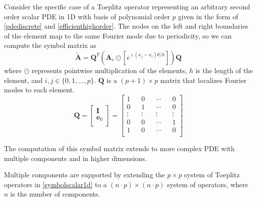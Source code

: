 \documentclass[review]{siamart190516}
\begin{document}
Consider the specific case of a Toeplitz operator representing an arbitrary second order scalar PDE in 1D with basis of polynomial order $p$ given in the form of \cref{pdediscrete} and \cref{efficienthighorder}.
The nodes on the left and right boundaries of the element map to the same Fourier mode due to periodicity, so we can compute the symbol matrix as
\begin{equation}\label{symbolscalar1d}
\tilde{\mathbf{A}} = \mathbf{Q}^T \left( \mathbf{A}_e \odot \left[ e^{\imath \left( x_j - x_i \right) \theta / h} \right] \right) \mathbf{Q}
\end{equation}
where $\odot$ represents pointwise multiplication of the elements, $h$ is the length of the element, and $i, j \in \lbrace 0, 1, \dots, p \rbrace$.
$\mathbf{Q}$ is a $\left( p + 1 \right) \times p$ matrix that localizes Fourier modes to each element.
\begin{equation}
\mathbf{Q} =
\begin{bmatrix}
    \mathbf{I}   \\
    \mathbf{e}_0 \\
\end{bmatrix} =
\begin{bmatrix}
    1      && 0      && \cdots && 0      \\
    0      && 1      && \cdots && 0      \\
    \vdots && \vdots && \vdots && \vdots \\
    0      && 0      && \cdots && 1      \\
    1      && 0      && \cdots && 0      \\
\end{bmatrix}
\end{equation}

The computation of this symbol matrix extends to more complex PDE with multiple components and in higher dimensions.

Multiple components are supported by extending the $p \times p$ system of Toeplitz operators in \cref{symbolscalar1d} to a $\left( n \cdot p \right) \times \left( n \cdot p \right)$ system of operators, where $n$ is the number of components.
\end{document}
